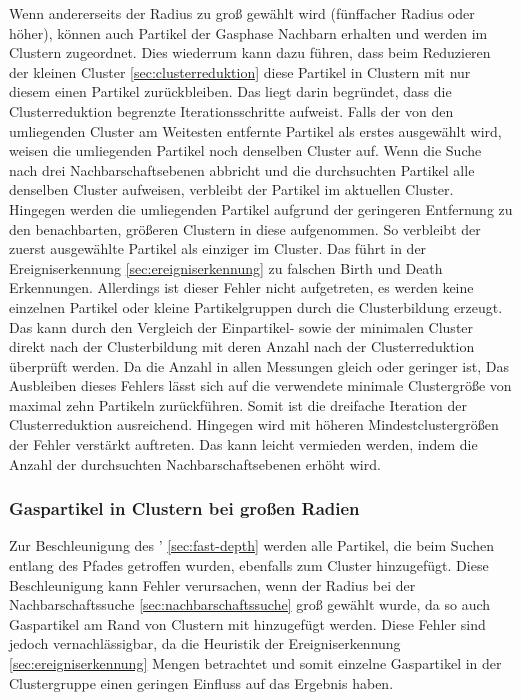 Wenn andererseits der Radius zu groß gewählt wird (fünffacher Radius oder höher), können auch Partikel der Gasphase Nachbarn erhalten und werden im  Clustern zugeordnet. Dies wiederrum kann dazu führen, dass beim Reduzieren der kleinen Cluster \autoref{sec:clusterreduktion} diese Partikel in Clustern mit nur diesem einen Partikel zurückbleiben. Das liegt darin begründet, dass die Clusterreduktion begrenzte Iterationsschritte aufweist. Falls der von den umliegenden Cluster am Weitesten entfernte Partikel als erstes ausgewählt wird, weisen die umliegenden Partikel noch denselben Cluster auf. Wenn die Suche nach drei Nachbarschaftsebenen abbricht und die durchsuchten Partikel alle denselben Cluster aufweisen, verbleibt der Partikel im aktuellen Cluster. Hingegen werden die umliegenden Partikel aufgrund der geringeren Entfernung zu den benachbarten, größeren Clustern in diese aufgenommen. So verbleibt der zuerst ausgewählte Partikel als einziger im Cluster. Das führt in der Ereigniserkennung \autoref{sec:ereigniserkennung} zu falschen Birth und Death Erkennungen.
Allerdings ist dieser Fehler nicht aufgetreten, es werden keine einzelnen Partikel oder kleine Partikelgruppen durch die Clusterbildung erzeugt. %
Das kann durch den Vergleich der Einpartikel- sowie der minimalen Cluster direkt nach der Clusterbildung mit deren Anzahl nach der Clusterreduktion überprüft werden. Da die Anzahl in allen Messungen gleich oder geringer ist, %
Das Ausbleiben dieses Fehlers lässt sich auf die verwendete minimale Clustergröße von maximal zehn Partikeln zurückführen. Somit ist die dreifache Iteration der Clusterreduktion ausreichend. Hingegen wird mit höheren Mindestclustergrößen der Fehler verstärkt auftreten. Das kann leicht vermieden werden, indem die Anzahl der durchsuchten Nachbarschaftsebenen erhöht wird.

\subsubsection*{Gaspartikel in Clustern bei großen Radien}

Zur Beschleunigung des ' \autoref{sec:fast-depth} werden alle Partikel, die beim Suchen entlang des Pfades getroffen wurden, ebenfalls zum Cluster hinzugefügt. Diese Beschleunigung kann Fehler verursachen, wenn der Radius bei der Nachbarschaftssuche \autoref{sec:nachbarschaftssuche} groß gewählt wurde, da so auch Gaspartikel am Rand von Clustern mit hinzugefügt werden. Diese Fehler sind jedoch vernachlässigbar, da die Heuristik der Ereigniserkennung \autoref{sec:ereigniserkennung} Mengen betrachtet und somit einzelne Gaspartikel in der Clustergruppe einen geringen Einfluss auf das Ergebnis haben.


